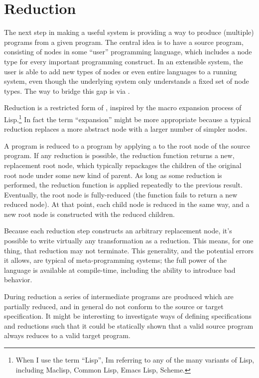 \section{Reduction}
\label{reduction}
The next step in making a useful system is providing a way to produce (multiple)  programs from a given  program. The central idea is to have a source program, consisting of nodes in some ``user'' programming language, which includes a node type for every important programming construct. In an extensible system, the user is able to add new types of nodes or even entire languages to a running system, even though the underlying system only understands a fixed set of node types. The way to bridge this gap is via .

Reduction is a restricted form of , inspired by the macro expansion process of Lisp.\footnote{When I use the term ``Lisp'', Im referring to any of the many variants of Lisp, including Maclisp, Common Lisp, Emacs Lisp, Scheme.} In fact the term ``expansion'' might be more appropriate because a typical reduction replaces a more abstract node with a larger number of simpler nodes.

A  program is reduced to a  program by applying a  to the root node of the source program. If any reduction is possible, the reduction function returns a new, replacement root node, which typically repackages the children of the original root node under some new kind of parent. As long as some reduction is performed, the reduction function is applied repeatedly to the previous result. Eventually, the root node is fully-reduced (the function fails to return a new reduced node). At that point, each child node is reduced in the same way, and a new root node is constructed with the reduced children.

Because each reduction step constructs an arbitrary replacement node, it's possible to write virtually any transformation as a reduction. This means, for one thing, that reduction may not terminate. This generality, and the potential errors it allows, are typical of meta-programming systems; the full power of the language is available at compile-time, including the ability to introduce bad behavior.

During reduction a series of intermediate programs are produced which are partially reduced, and in general do not conform to the source or target specification. It might be interesting to investigate ways of defining specifications and reductions such that it could be statically shown that a valid source program always reduces to a valid target program.

